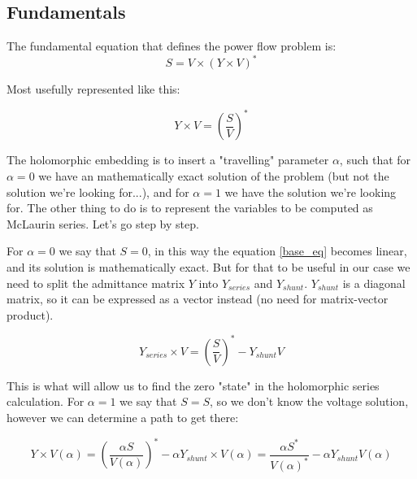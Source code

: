 \documentclass[nols,a4paper,twoside,notoc,fleqn]{tufte-book}
\begin{document}
\subsection{Fundamentals} \label{helm_fundamentals}

The fundamental equation that defines the power flow problem is:
\begin{equation}
{S} = {V} \times ({Y} \times {V})^*
\end{equation}

Most usefully represented like this:


\begin{equation}
{{Y} \times {V}} = \left(\frac{{S}}{{V}}\right)^* 
\label{base_eq}
\end{equation}


The holomorphic embedding is to insert a "travelling" parameter $\alpha$, such that for $\alpha=0$ we have an mathematically exact solution of the problem (but not the solution we're looking for...), and for $\alpha=1$ we have the solution we're looking for. The other thing to do is to represent the variables to be computed as McLaurin series. Let's go step by step.\newline

For $\alpha=0$ we say that $S=0$, in this way the equation \ref{base_eq} becomes linear, and its solution is mathematically exact. But for that to be useful in our case we need to split the admittance matrix $Y$ into $Y_{series}$ and $Y_{shunt}$. $Y_{shunt}$ is a diagonal matrix, so it can be expressed as a vector instead (no need for matrix-vector product).

\begin{equation}
{Y}_{series} \times {V} = \left(\frac{{S}}{{V}}\right)^* - {Y}_{shunt} {V}
\label{base_eq_alpha_0}
\end{equation}

This is what will allow us to find the zero "state" in the holomorphic series calculation. For $\alpha=1$ we say that $S=S$, so we don't know the voltage solution, however we can determine a path to get there:

\begin{equation}
{    {Y }\times     {V}( \alpha )} = \left(\frac{ \alpha    {S}}{{V}( \alpha )}\right)^* - \alpha {Y}_{shunt} \times {V}( \alpha ) = \frac{ \alpha{S}^*}{{V}( \alpha )^*} - \alpha {Y}_{shunt} {V}( \alpha )
\label{base_eq_embedded}
\end{equation}
\end{document}
